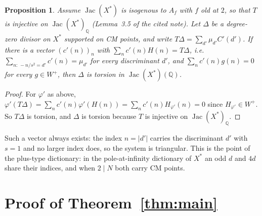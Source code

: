 \documentclass[11pt,reqno]{amsart}
\theoremstyle{plain}
\newtheorem{proposition}[theorem]{Proposition}
\theoremstyle{definition}
\DeclareMathOperator{\Jac}{Jac}
\newcommand{\Q}{\mathbb{Q}}
\begin{document}
\begin{proposition}\label{prop:odd}
Assume $\Jac(X^*)$ is isogenous to $A_f$ with $f$ old at $2$, so that $T$ is injective on
$\Jac(X^*)_\Q$ (Lemma~3.5 of the cited note). Let $\Delta$ be a degree-zero divisor on $X^*$ supported
on CM points, and write $T\Delta=\sum_{d'}\mu_{d'}C'(d')$. If there is a vector $(c'(n))_n$ with
$\sum_nc'(n)H(n)=T\Delta$, i.e.\ $\sum_{n:\,-n/s^2=d'}c'(n)=\mu_{d'}$ for every discriminant $d'$, and
$\sum_nc'(n)g(n)=0$ for every $g\in W^+$, then $\Delta$ is torsion in $\Jac(X^*)(\Q)$.
\end{proposition}

\begin{proof}
For $\varphi'$ as above, $\varphi'(T\Delta)=\sum_nc'(n)\varphi'(H(n))=\sum_nc'(n)H_{\varphi'}(n)=0$
since $H_{\varphi'}\in W^+$. So $T\Delta$ is torsion, and $\Delta$ is torsion because $T$ is injective
on $\Jac(X^*)_\Q$.
\end{proof}

Such a vector always exists: the index $n=|d'|$ carries the discriminant $d'$ with $s=1$ and no
larger index does, so the system is triangular. This is the point of the plus-type dictionary: in
the pole-at-infinity dictionary of $X^*$ an odd $d$ and $4d$ share their indices, and when $2\mid N$
both carry CM points.

\section{Proof of Theorem~\ref{thm:main}}
\end{document}
